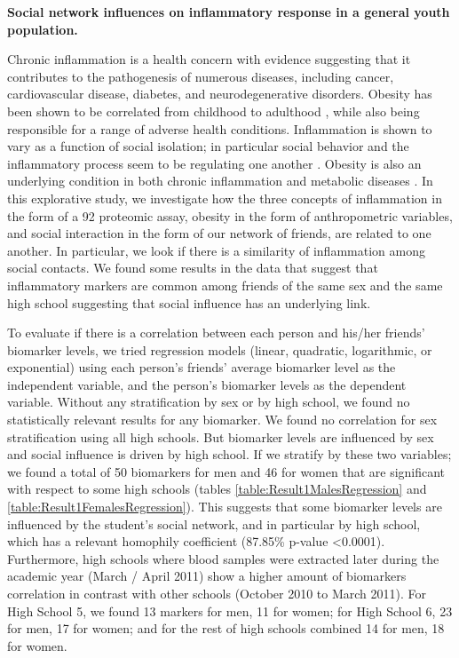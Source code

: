 \textbf{Social network influences on inflammatory response in a general youth population.}

Chronic inflammation is a health concern with evidence suggesting that it contributes to the pathogenesis of numerous diseases, including cancer, cardiovascular disease, diabetes, and neurodegenerative disorders. Obesity has been shown to be correlated from childhood to adulthood \cite{Woo2019}, while also being responsible for a range of adverse health conditions. Inflammation is shown to vary as a function of social isolation; in particular social behavior and the inflammatory process seem to be regulating one another \cite{Zhang2015, Karczewski2018, Safaei2021, Eisenberger2016, Bang2019, Henriquez2022, Koyama2021}. Obesity is also an underlying condition in both chronic inflammation and metabolic diseases \cite{Lee2013, Karczewski2018, Dhurandhar2014CounteringTE}. In this explorative study, we investigate how the three concepts of inflammation in the form of a 92 proteomic assay, obesity in the form of anthropometric variables, and social interaction in the form of our network of friends, are related to one another. In particular, we look if there is a similarity of inflammation among social contacts. We found some results in the data that suggest that inflammatory markers are common among friends of the same sex and the same high school suggesting that social influence has an underlying link.

To evaluate if there is a correlation between each person and his/her friends’ biomarker levels, we tried regression models (linear, quadratic, logarithmic, or exponential) using each person’s friends’ average biomarker level as the independent variable, and the person’s biomarker levels as the dependent variable. Without any stratification by sex or by high school, we found no statistically relevant results for any biomarker. We found no correlation for sex stratification using all high schools. But biomarker levels are influenced by sex and social influence is driven by high school. If we stratify by these two variables; we found a total of 50 biomarkers for men and 46 for women that are significant with respect to some high schools (tables \ref{table:Result1MalesRegression} and \ref{table:Result1FemalesRegression}). This suggests that some biomarker levels are influenced by the student’s social network, and in particular by high school, which has a relevant homophily coefficient (87.85\% p-value <0.0001). Furthermore, high schools where blood samples were extracted later during the academic year (March / April 2011) show a higher amount of biomarkers correlation in contrast with other schools (October 2010 to March 2011). For High School 5, we found 13 markers for men, 11 for women; for High School 6, 23 for men, 17 for women; and for the rest of high schools combined 14 for men, 18 for women.

